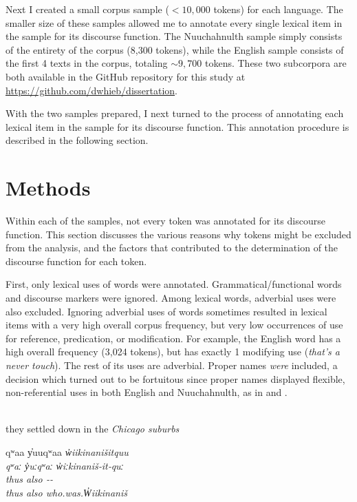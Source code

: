 Next I created a small corpus sample ($<10,000$ tokens) for each language. The smaller size of these samples allowed me to annotate every single lexical item in the sample for its discourse function. The Nuuchahnulth sample simply consists of the entirety of the corpus (8,300 tokens), while the English sample consists of the first 4 texts in the corpus, totaling $\sim9,700$ tokens. These two subcorpora are both available in the GitHub repository for this study at \url{https://github.com/dwhieb/dissertation}.

With the two samples prepared, I next turned to the process of annotating each lexical item in the sample for its discourse function. This annotation procedure is described in the following section.

\section{Methods}
\label{sec:3.3}

Within each of the samples, not every token was annotated for its discourse function. This section discusses the various reasons why tokens might be excluded from the analysis, and the factors that contributed to the determination of the discourse function for each token.

First, only lexical uses of words were annotated. Grammatical/functional words and discourse markers were ignored. Among lexical words, adverbial uses were also excluded. Ignoring adverbial uses of words sometimes resulted in lexical items with a very high overall corpus frequency, but very low occurrences of use for reference, predication, or modification. For example, the English word  has a high overall frequency (3,024 tokens), but has exactly 1 modifying use (\textit{that's a \em{never} touch}). The rest of its uses are adverbial. Proper names \emph{were} included, a decision which turned out to be fortuitous since proper names displayed flexible, non-referential uses in both English and Nuuchahnulth, as in  and .

\begin{exe}

  \ex\label{ex:3.1}
  \\
  they settled down in the \em{Chicago} suburbs

  \ex\label{ex:3.2}
  \vfix
  \gllll qʷaa y̓uuqʷaa \em{w̓iikinanišitquu}\\
         qʷaː y̓uːqʷaː \em{w̓iːkinaniš‑it‑quː}\\
         thus also    \em{‑‑}\\
         thus also    \em{who.was.W̓iikinaniš}\\
         \vfix

\end{exe}

